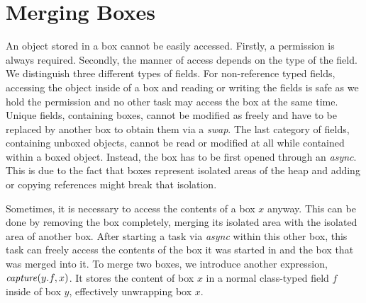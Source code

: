 \section{Merging Boxes}
An object stored in a box cannot be easily accessed. Firstly, a permission is always required. Secondly, the manner of access depends on the type of the field. We distinguish three different types of fields. For non-reference typed fields, accessing the object inside of a box and reading or writing the fields is safe as we hold the permission and no other task may access the box at the same time. Unique fields, containing boxes, cannot be modified as freely and have to be replaced by another box to obtain them via a \textit{swap}. The last category of fields, containing unboxed objects, cannot be read or modified at all while contained within a boxed object. Instead, the box has to be first opened through an \textit{async}. This is due to the fact that boxes represent isolated areas of the heap and adding or copying references might break that isolation.

Sometimes, it is necessary to access the contents of a box $x$ anyway. This can be done by removing the box completely, merging its isolated area with the isolated area of another box. After starting a task via \textit{async} within this other box, this task can freely access the contents of the box it was started in and the box that was merged into it. To merge two boxes, we introduce another expression, $\mathop{\mathit{capture}}(y.f, x)$. It stores the content of box $x$ in a normal class-typed field $f$ inside of box $y$, effectively unwrapping box $x$.

